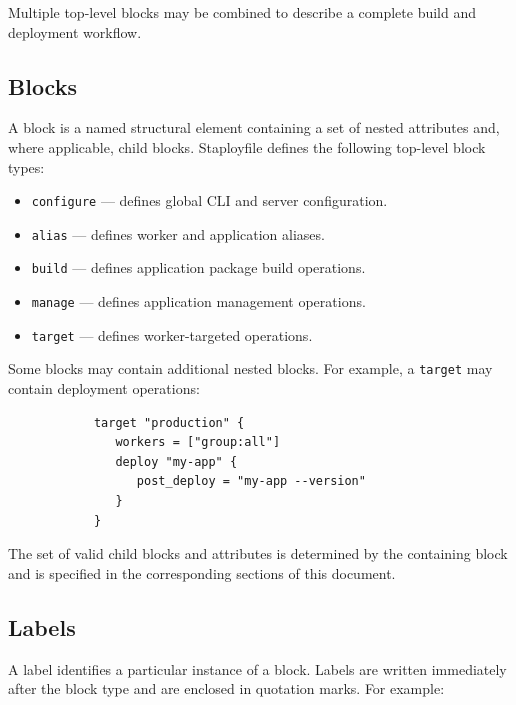 \documentclass[11pt,a4paper]{article}
\begin{document}
    Multiple top-level blocks may be combined to describe a complete build
    and deployment workflow.

    \subsection{Blocks}\label{subsec:blocks}

    A block is a named structural element containing a set of nested
    attributes and, where applicable, child blocks.
    Staployfile defines the following top-level block types:

    \begin{itemize}
        \item \texttt{configure} --- defines global CLI and server configuration.
        \item \texttt{alias} --- defines worker and application aliases.
        \item \texttt{build} --- defines application package build operations.
        \item \texttt{manage} --- defines application management operations.
        \item \texttt{target} --- defines worker-targeted operations.
    \end{itemize}

    Some blocks may contain additional nested blocks.
    For example, a \texttt{target} may contain deployment operations:

    \begin{center}
        \begin{verbatim}
            target "production" {
               workers = ["group:all"]
               deploy "my-app" {
                  post_deploy = "my-app --version"
               }
            }
        \end{verbatim}
    \end{center}

    The set of valid child blocks and attributes is determined by the
    containing block and is specified in the corresponding sections of this document.

    \subsection{Labels}\label{subsec:labels}

    A label identifies a particular instance of a block.
    Labels are written immediately after the block type and are enclosed in quotation marks.
    For example:
\end{document}
